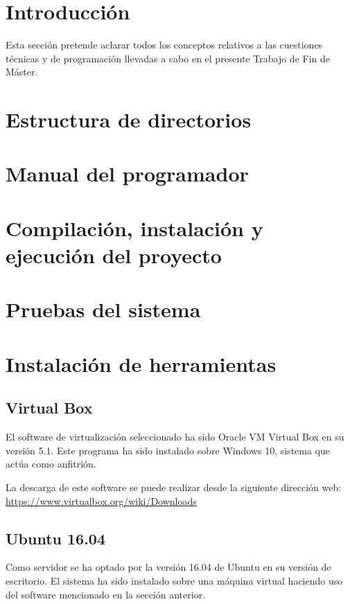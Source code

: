 
\section{Introducción}

Esta sección pretende aclarar todos los conceptos relativos a las cuestiones técnicas y de programación llevadas a cabo en el presente Trabajo de Fin de Máster.

\section{Estructura de directorios}

\section{Manual del programador}

\section{Compilación, instalación y ejecución del proyecto}

\section{Pruebas del sistema}

\section{Instalación de herramientas}

\subsection{Virtual Box}
El software de virtualización seleccionado ha sido Oracle VM Virtual Box en su versión 5.1. Este programa ha sido instalado sobre Windows 10, sistema que actúa como anfitrión.

La descarga de este software se puede realizar desde la siguiente dirección web: \url{https://www.virtualbox.org/wiki/Downloads}

\subsection{Ubuntu 16.04}
Como servidor se ha optado por la versión 16.04 de Ubuntu en su versión de escritorio. El sistema ha sido instalado sobre una máquina virtual haciendo uso del software mencionado en la sección anterior.

